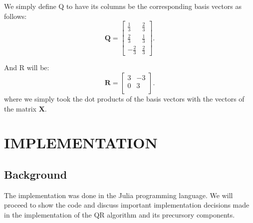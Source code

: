 \documentclass[onecolumn]{webofc}
\begin{document}
We simply define Q to have its columns be the corresponding basis vectors as follows:
$$\mathbf{Q} = 
\begin{bmatrix}
\frac{1}{3} & \frac{2}{3} \\
\frac{2}{3} & \frac{1}{3} \\
-\frac{2}{3} & \frac{2}{3} 
\end{bmatrix}.$$

And R will be:
$$\mathbf{R} = 
\begin{bmatrix}
3 & -3 \\
0 & 3 \\
\end{bmatrix}.$$
where we simply took the dot products of the basis vectors with the vectors of the matrix $\mathbf{X}$.

\section{IMPLEMENTATION}

\subsection{Background}
The implementation was done in the Julia programming language. We will proceed to show the code and discuss important implementation decisions made in the implementation of the QR algorithm and its precursory components.
\end{document}
